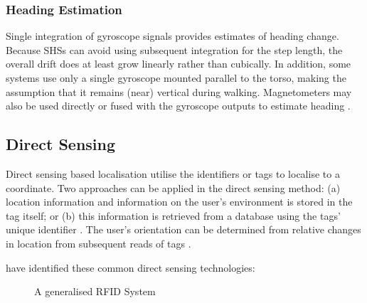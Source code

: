             \subsubsection{Heading Estimation}
            
            Single integration of gyroscope signals provides estimates of heading change. Because SHSs can avoid using subsequent integration for the step length, the overall drift does at least grow linearly rather than cubically. In addition, some systems use only a single gyroscope mounted parallel to the torso, making the assumption that it remains (near) vertical during walking. Magnetometers may also be used directly or fused with the gyroscope outputs to estimate heading \cite{harle2013PIndoor}.
            
            \subsection{Direct Sensing}
             Direct sensing based localisation utilise the identifiers or tags to localise to a coordinate. Two approaches can be applied in the direct sensing method:  (a) location information and information on the user’s environment is stored in the tag itself; or (b) this information is retrieved from
a database using the tags’ unique identifier \cite{fallah2013indoor}.  The user’s orientation can be determined from relative changes in location from subsequent reads of tags \cite{willis2005rfid}.

			\citeauthor{fallah2013indoor} have identified these common direct sensing technologies:
            
            \begin{figure}[htbp!]
                \centering        
                \caption{A generalised RFID System\cite{mainetti2014Indoorlit}}
                 \label{fig:litRev_RFIDschema}
          	  	\end{figure}
              
